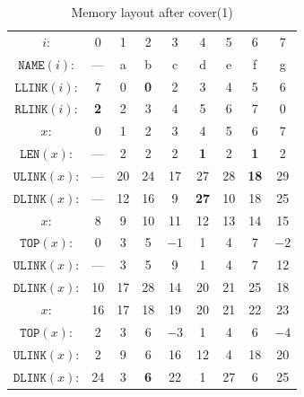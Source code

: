 \documentclass[a4paper,landscape,11pt]{article}
\begin{document}
\begin{table}[h!]
	\begin{center}
		\caption{Memory layout after cover(1)}
		\begin{tabular}{c c c c c c c c c }
			\hline
			$i$:                 & 0          & 1  & 2          & 3          & 4           & 5  & 6           & 7    \\
			$\texttt{NAME}(i)$:  & ---        & a  & b          & c          & d           & e  & f           & g    \\
			$\texttt{LLINK}(i)$: & 7          & 0  & \textbf{0} & 2          & 3           & 4  & 5           & 6    \\
			$\texttt{RLINK}(i)$: & \textbf{2} & 2  & 3          & 4          & 5           & 6  & 7           & 0    \\
			\hline
			$x$:                 & 0          & 1  & 2          & 3          & 4           & 5  & 6           & 7    \\
			$\texttt{LEN}(x)$:   & ---        & 2  & 2          & 2          & \textbf{1}  & 2  & \textbf{1}  & 2    \\
			$\texttt{ULINK}(x)$: & ---        & 20 & 24         & 17         & 27          & 28 & \textbf{18} & 29   \\
			$\texttt{DLINK}(x)$: & ---        & 12 & 16         & 9          & \textbf{27} & 10 & 18          & 25   \\
			\hline
			$x$:                 & 8          & 9  & 10         & 11         & 12          & 13 & 14          & 15   \\
			$\texttt{TOP}(x)$:   & 0          & 3  & 5          & $-1$       & 1           & 4  & 7           & $-2$ \\
			$\texttt{ULINK}(x)$: & ---        & 3  & 5          & 9          & 1           & 4  & 7           & 12   \\
			$\texttt{DLINK}(x)$: & 10         & 17 & 28         & 14         & 20          & 21 & 25          & 18   \\
			\hline
			$x$:                 & 16         & 17 & 18         & 19         & 20          & 21 & 22          & 23   \\
			$\texttt{TOP}(x)$:   & 2          & 3  & 6          & $-3$       & 1           & 4  & 6           & $-4$ \\
			$\texttt{ULINK}(x)$: & 2          & 9  & 6          & 16         & 12          & 4  & 18          & 20   \\
			$\texttt{DLINK}(x)$: & 24         & 3  & \textbf{6} & 22         & 1           & 27 & 6           & 25   \\

\end{tabular}
\end{center}
\end{table}
\end{document}
